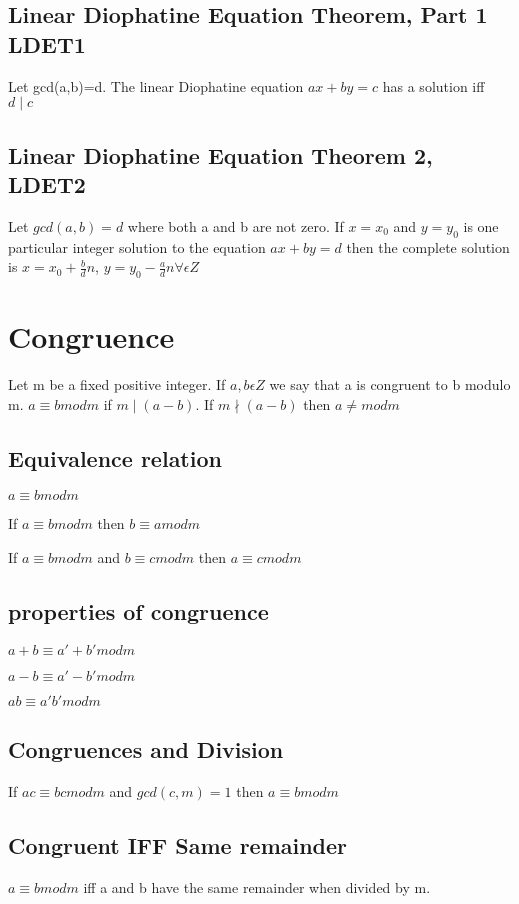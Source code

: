 \documentclass[12pt]{article}
\begin{document}
\subsection{Linear Diophatine Equation Theorem, Part 1 LDET1}
Let gcd(a,b)=d. The linear Diophatine equation $ax+by=c$ has a solution iff
$d\mid c$
\subsection{Linear Diophatine Equation Theorem 2, LDET2}
Let $gcd(a,b)=d$ where both a and b are not zero. If $x=x_0$ and $y=y_0$ is one
particular integer solution to the equation $ax+by=d$ then the complete
solution is $x=x_0+\frac{b}{d} n$, $y=y_0-\frac{a}{d} n \forall \epsilon Z$
\section{Congruence}
Let m be a fixed positive integer. If $a,b \epsilon Z$ we say that a is
congruent to b modulo m. $a\equiv b mod m$ if $m\mid (a-b)$. If $m \nmid (a-b)$
then $a\neq mod m$
\subsection{Equivalence relation}
\begin{enum}
\item $a\equiv b mod m$
\item If $a\equiv b mod m $ then $b\equiv a mod m$
\item If $a\equiv b mod m$ and $b\equiv c mod m$ then $a\equiv c mod m$
\end{enum}
\subsection{properties of congruence}
\begin{enum}
\item $a+b\equiv a'+b' mod m$
\item $a-b\equiv a'-b'mod m$
\item $ab\equiv a'b'mod m$
\end {enum}
\subsection{Congruences and Division}
If $ac\equiv bc mod m$ and $gcd(c,m)=1$ then $a\equiv b mod m$
\subsection{Congruent IFF Same remainder}
$a\equiv b mod m$ iff a and b have the same remainder when divided by m.
\end{document}
